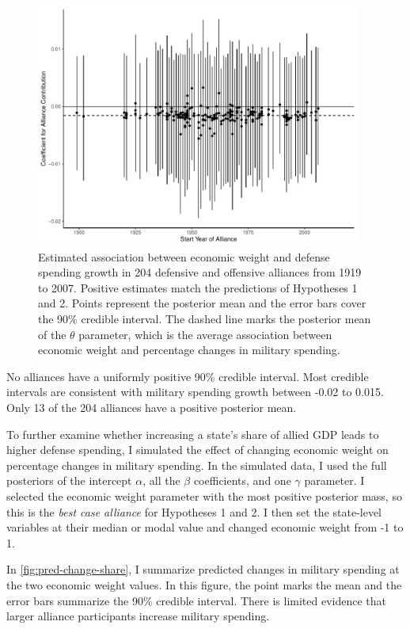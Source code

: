 \documentclass[12pt]{article}
\begin{document}
\begin{figure}[htbp]
	\centering
		\includegraphics[width=0.95\textwidth]{alliance-coefs-year.pdf}
	\caption{Estimated association between economic weight and defense spending growth in 204 defensive and offensive alliances from 1919 to 2007. Positive estimates match the predictions of Hypotheses 1 and 2. Points represent the posterior mean and the error bars cover the 90\% credible interval. The dashed line marks the posterior mean of the $\theta$ parameter, which is the average association between economic weight and percentage changes in military spending.}
	\label{fig:alliance-coefs-year}
\end{figure}


No alliances have a uniformly positive 90\% credible interval. 
Most credible intervals are consistent with military spending growth between -0.02 to 0.015. 
Only 13 of the 204 alliances have a positive posterior mean. 


To further examine whether increasing a state's share of allied GDP leads to higher defense spending, I simulated the effect of changing economic weight on percentage changes in military spending. 
In the simulated data, I used the full posteriors of the intercept $\alpha$, all the $\beta$ coefficients, and one $\gamma$ parameter. 
I selected the economic weight parameter with the most positive posterior mass, so this is the \emph{best case alliance} for Hypotheses 1 and 2. 
I then set the state-level variables at their median or modal value and changed economic weight from -1 to 1. 


In \autoref{fig:pred-change-share}, I summarize predicted changes in military spending at the two economic weight values. 
In this figure, the point marks the mean and the error bars summarize the 90\% credible interval. 
There is limited evidence that larger alliance participants increase military spending. 
\end{document}
